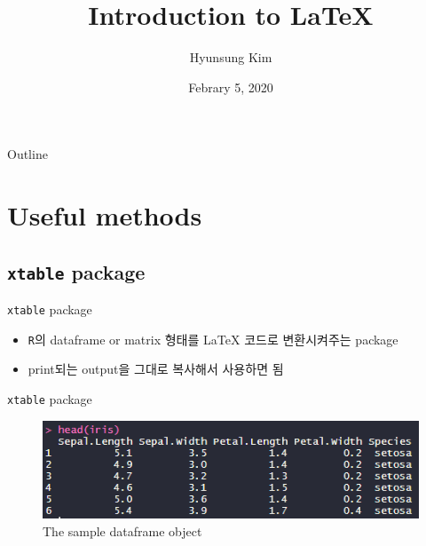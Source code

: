 \documentclass{beamer}
\title{Introduction to \LaTeX}
\date[Short Occasion]{Febrary 5, 2020}
\author{Hyunsung Kim}
\institute[Dept. of Statistics]
	{Department of Statistics\\
	Chung-Ang University}
\begin{document}
\begin{frame}
  \titlepage
\end{frame}

\begin{frame}{Outline}
  \tableofcontents
\end{frame}

\section{Useful methods}

\subsection{\texttt{xtable} package}

\begin{frame}{\texttt{xtable} package}
  \begin{itemize}
  	\item {
	    \texttt{R}의 dataframe or matrix 형태를 \textrm{\LaTeX} 코드로 변환시켜주는 package
	}
	\item {
		print되는 output을 그대로 복사해서 사용하면 됨
	}
  \end{itemize}
\end{frame}

\begin{frame}{\texttt{xtable} package}
	\begin{figure}[h] %
		\begin{center}
			\includegraphics[width=0.9\linewidth]{img/xtable1.png}
		\end{center}
		\caption{The sample dataframe object}
		\label{fig:long}
		\label{fig:onecol}
	\end{figure}
\end{frame}
\end{document}
